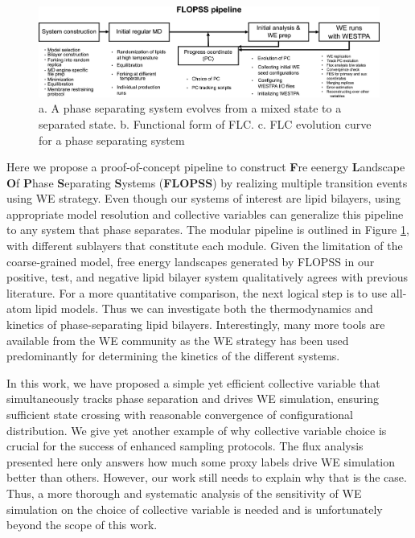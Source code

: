 \documentclass{biophys-new}
\begin{document}
\begin{figure}[hbt!]
\centering
\includegraphics[width=1\linewidth]{Figures/Main/8/placeholder.jpg}
\caption{a. A phase separating system evolves from a mixed state to a separated state. b. Functional form of FLC. c. FLC evolution curve for a phase separating system}
\label{figs8:view}
\end{figure}

Here we propose a proof-of-concept pipeline to construct \textbf{F}re eenergy \textbf{L}andscape \textbf{O}f \textbf{P}hase \textbf{S}eparating \textbf{S}ystems (\textbf{FLOPSS}) by realizing multiple transition events using WE strategy.
Even though our systems of interest are lipid bilayers, using appropriate model resolution and collective variables can generalize this pipeline to any system that phase separates.
The modular pipeline is outlined in Figure \ref{figs8:view}, with different sublayers that constitute each module.
Given the limitation of the coarse-grained model, free energy landscapes generated by FLOPSS in our positive, test, and negative lipid bilayer system qualitatively agrees with previous literature.
For a more quantitative comparison, the next logical step is to use all-atom lipid models.
Thus we can investigate both the thermodynamics and kinetics of phase-separating lipid bilayers.
Interestingly, many more tools are available from the WE community as the WE strategy has been used predominantly for determining the kinetics of the different systems.

In this work, we have proposed a simple yet efficient collective variable that simultaneously tracks phase separation and drives WE simulation, ensuring sufficient state crossing with reasonable convergence of configurational distribution. 
We give yet another example of why collective variable choice is crucial for the success of enhanced sampling protocols. 
The flux analysis presented here only answers how much some proxy labels drive WE simulation better than others.
However, our work still needs to explain why that is the case.
Thus, a more thorough and systematic analysis of the sensitivity of WE simulation on the choice of collective variable is needed and is unfortunately beyond the scope of this work.
\end{document}
